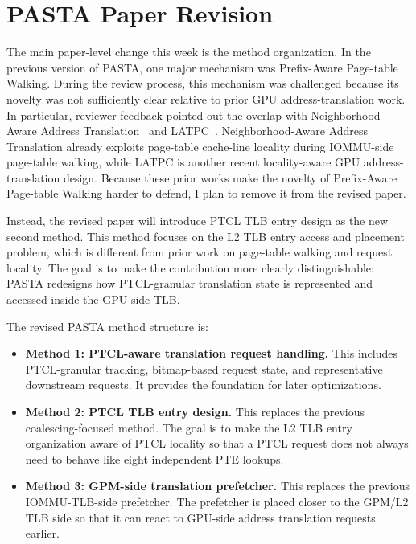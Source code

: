 \documentclass[11pt]{article}
\begin{document}
\section{PASTA Paper Revision}

The main paper-level change this week is the method organization. In the
previous version of PASTA, one major mechanism was Prefix-Aware Page-table
Walking. During the review process, this mechanism was challenged because its
novelty was not sufficiently clear relative to prior GPU address-translation
work. In particular, reviewer feedback pointed out the overlap with
Neighborhood-Aware Address Translation~\cite{shin2018neighborhood} and
LATPC~\cite{ha2025latpc}. Neighborhood-Aware Address Translation already
exploits page-table cache-line locality during IOMMU-side page-table walking,
while LATPC is another recent locality-aware GPU address-translation design.
Because these prior works make the novelty of Prefix-Aware Page-table Walking
harder to defend, I plan to remove it from the revised paper.

Instead, the revised paper will introduce PTCL TLB entry design as the new
second method. This method focuses on the L2 TLB entry access and placement
problem, which is different from prior work on page-table walking and request
locality. The goal is to make the contribution more clearly distinguishable:
PASTA redesigns how PTCL-granular translation state is represented and accessed
inside the GPU-side TLB.

The revised PASTA method structure is:

\begin{itemize}
  \item \textbf{Method 1: PTCL-aware translation request handling.}
        This includes PTCL-granular tracking, bitmap-based request state, and
        representative downstream requests. It provides the foundation for later
        optimizations.
  \item \textbf{Method 2: PTCL TLB entry design.}
        This replaces the previous coalescing-focused method. The goal is to
        make the L2 TLB entry organization aware of PTCL locality so that a
        PTCL request does not always need to behave like eight independent PTE
        lookups.
  \item \textbf{Method 3: GPM-side translation prefetcher.}
        This replaces the previous IOMMU-TLB-side prefetcher. The prefetcher is
        placed closer to the GPM/L2 TLB side so that it can react to GPU-side
        address translation requests earlier.
\end{itemize}
\end{document}

